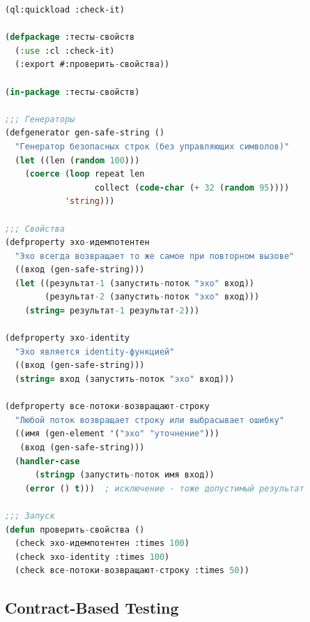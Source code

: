 \documentclass[10pt, oneside]{article}
\begin{document}
\begin{lstlisting}[language=CommonLisp,caption={Property-based тесты}]
(ql:quickload :check-it)

(defpackage :тесты-свойств
  (:use :cl :check-it)
  (:export #:проверить-свойства))

(in-package :тесты-свойств)

;;; Генераторы
(defgenerator gen-safe-string ()
  "Генератор безопасных строк (без управляющих символов)"
  (let ((len (random 100)))
    (coerce (loop repeat len
                  collect (code-char (+ 32 (random 95))))
            'string)))

;;; Свойства
(defproperty эхо-идемпотентен
  "Эхо всегда возвращает то же самое при повторном вызове"
  ((вход (gen-safe-string)))
  (let ((результат-1 (запустить-поток "эхо" вход))
        (результат-2 (запустить-поток "эхо" вход)))
    (string= результат-1 результат-2)))

(defproperty эхо-identity
  "Эхо является identity-функцией"
  ((вход (gen-safe-string)))
  (string= вход (запустить-поток "эхо" вход)))

(defproperty все-потоки-возвращают-строку
  "Любой поток возвращает строку или выбрасывает ошибку"
  ((имя (gen-element '("эхо" "уточнение")))
   (вход (gen-safe-string)))
  (handler-case
      (stringp (запустить-поток имя вход))
    (error () t)))  ; исключение - тоже допустимый результат

;;; Запуск
(defun проверить-свойства ()
  (check эхо-идемпотентен :times 100)
  (check эхо-identity :times 100)
  (check все-потоки-возвращают-строку :times 50))
\end{lstlisting}

\subsection{Contract-Based Testing}
\end{document}
